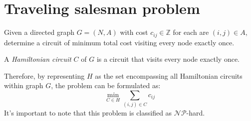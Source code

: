 \section{Traveling salesman problem}

Given a directed graph $G=(N,A)$ with cost $c_{ij} \in \mathbb{Z}$ for each are $(i,j) \in A$, determine a circuit of minimum total cost visiting every node exactly once. 
\begin{definition}
    A \emph{Hamiltonian circuit} $C$ of $G$ is a circuit that visits every node exactly once. 
\end{definition}
Therefore, by representing $H$ as the set encompassing all Hamiltonian circuits within graph $G$, the problem can be formulated as:
\[\min_{C \in H}{\sum_{(i,j) \in C}{c_{ij}}}\]
It's important to note that this problem is classified as $\mathcal{N}\mathcal{P}$-hard. 